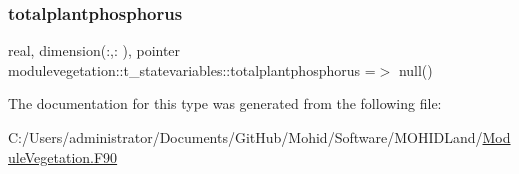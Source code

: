 \subsubsection{\texorpdfstring{totalplantphosphorus}{totalplantphosphorus}}
{\footnotesize\ttfamily real, dimension(\+:,\+:  ), pointer modulevegetation\+::t\+\_\+statevariables\+::totalplantphosphorus =$>$ null()\hspace{0.3cm}{\ttfamily [private]}}



The documentation for this type was generated from the following file\+:\begin{DoxyCompactItemize}
\item 
C\+:/\+Users/administrator/\+Documents/\+Git\+Hub/\+Mohid/\+Software/\+M\+O\+H\+I\+D\+Land/\mbox{\hyperlink{_module_vegetation_8_f90}{Module\+Vegetation.\+F90}}\end{DoxyCompactItemize}
